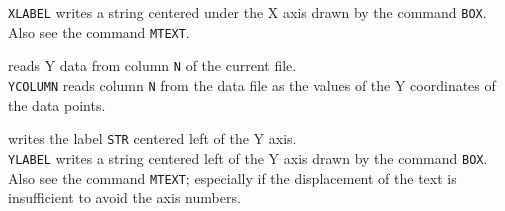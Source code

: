 	{\tt XLABEL} writes a string centered under the
	X axis drawn by the command {\tt BOX}.
	Also see the command {\tt MTEXT}.
\item [{\tt YCOLUMN N } --] reads Y data from column {\tt N} of the current file.\\
	{\tt YCOLUMN} reads column {\tt N} from the
	data file as the values of the Y coordinates of the data points.
\item [{\tt YLABEL str } --] writes the label {\tt STR} centered left of the Y axis.\\
	{\tt YLABEL} writes a string centered left of the Y axis
	drawn by the command {\tt BOX}.  Also
	see the command {\tt MTEXT};
	especially if the displacement of the text is insufficient to
	avoid the axis numbers.
